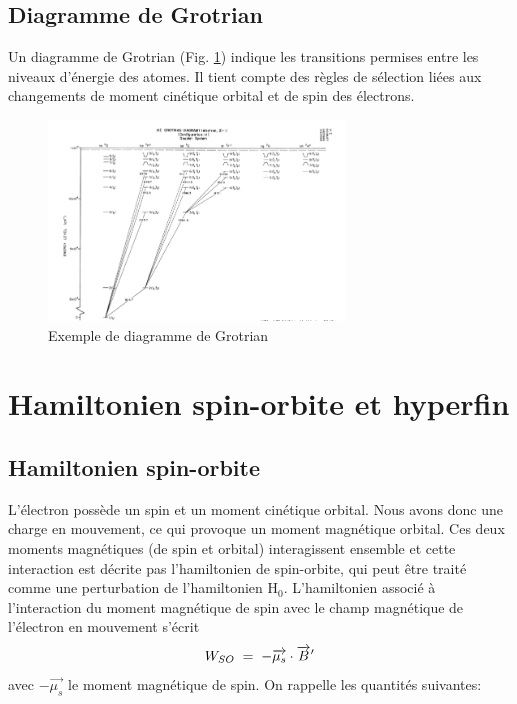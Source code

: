 \subsection{Diagramme de Grotrian}
Un diagramme de Grotrian (Fig. \ref{fig:grotrian}) indique les transitions permises entre les niveaux d'énergie des atomes. Il tient compte des règles de sélection liées aux changements de moment cinétique orbital et de spin des électrons.

\begin{figure}[ht]
    \centering
    \includegraphics[width=0.7\textwidth]{Images2/grotrian.PNG}
    \caption{Exemple de diagramme de Grotrian}
    \label{fig:grotrian}
\end{figure}



\newpage
\section{Hamiltonien spin-orbite et hyperfin}
\subsection{Hamiltonien spin-orbite}
L'électron possède un spin et un moment cinétique orbital. Nous avons donc une charge en mouvement, ce qui provoque un moment magnétique orbital. Ces deux moments magnétiques (de spin et orbital) interagissent ensemble et cette interaction est décrite pas l'hamiltonien de spin-orbite, qui peut être traité comme une perturbation de l'hamiltonien H$_0$. L'hamiltonien associé à l'interaction du moment magnétique de spin avec le champ magnétique de l’électron en mouvement s'écrit
\[
    W_{SO} \; = \;  -\overrightarrow{\mu_s}\cdot\overrightarrow{B}'
\]
avec $-\overrightarrow{\mu_s}$ le moment magnétique de spin. On rappelle les quantités suivantes:

